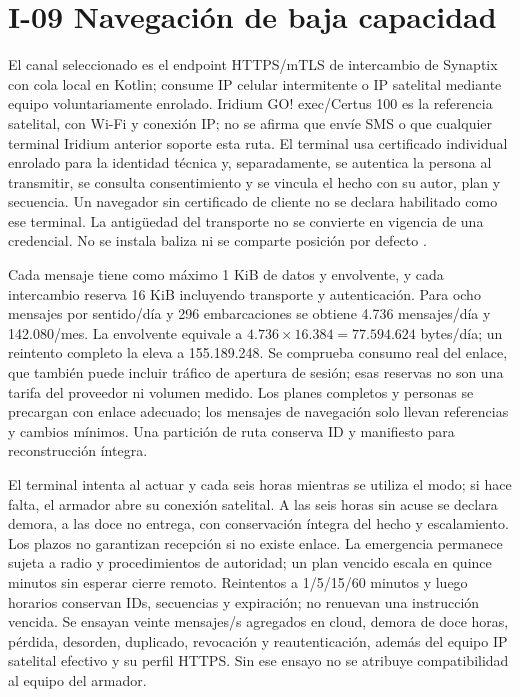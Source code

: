 \section*{I-09 Navegación de baja capacidad}
El canal seleccionado es el endpoint HTTPS/mTLS de intercambio de Synaptix con cola local en Kotlin; consume IP celular intermitente o IP satelital mediante equipo voluntariamente enrolado. Iridium GO! exec/Certus 100 es la referencia satelital, con Wi-Fi y conexión IP; no se afirma que envíe SMS o que cualquier terminal Iridium anterior soporte esta ruta. El terminal usa certificado individual enrolado para la identidad técnica y, separadamente, se autentica la persona al transmitir, se consulta consentimiento y se vincula el hecho con su autor, plan y secuencia. Un navegador sin certificado de cliente no se declara habilitado como ese terminal. La antigüedad del transporte no se convierte en vigencia de una credencial. No se instala baliza ni se comparte posición por defecto \parencites{c8-iridium-exec,c8-iridium-faq}.

Cada mensaje tiene como máximo 1 KiB de datos y envolvente, y cada intercambio reserva 16 KiB incluyendo transporte y autenticación. Para ocho mensajes por sentido/día y 296 embarcaciones se obtiene 4.736 mensajes/día y 142.080/mes. La envolvente equivale a $4.736\times16.384=77.594.624$ bytes/día; un reintento completo la eleva a 155.189.248. Se comprueba consumo real del enlace, que también puede incluir tráfico de apertura de sesión; esas reservas no son una tarifa del proveedor ni volumen medido. Los planes completos y personas se precargan con enlace adecuado; los mensajes de navegación solo llevan referencias y cambios mínimos. Una partición de ruta conserva ID y manifiesto para reconstrucción íntegra.

El terminal intenta al actuar y cada seis horas mientras se utiliza el modo; si hace falta, el armador abre su conexión satelital. A las seis horas sin acuse se declara demora, a las doce no entrega, con conservación íntegra del hecho y escalamiento. Los plazos no garantizan recepción si no existe enlace. La emergencia permanece sujeta a radio y procedimientos de autoridad; un plan vencido escala en quince minutos sin esperar cierre remoto. Reintentos a 1/5/15/60 minutos y luego horarios conservan IDs, secuencias y expiración; no renuevan una instrucción vencida. Se ensayan veinte mensajes/s agregados en cloud, demora de doce horas, pérdida, desorden, duplicado, revocación y reautenticación, además del equipo IP satelital efectivo y su perfil HTTPS. Sin ese ensayo no se atribuye compatibilidad al equipo del armador.

